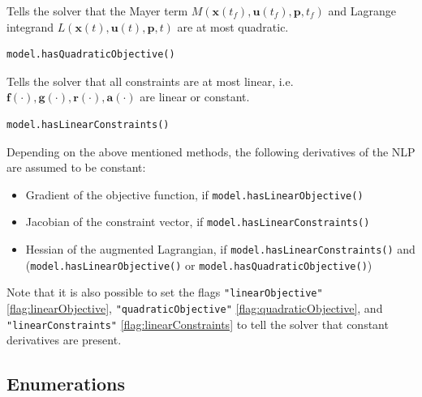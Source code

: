 \documentclass[12pt]{article}
\renewcommand{\v}{\bm}
\begin{document}
\begin{mdframed}[backgroundcolor=gray!10, roundcorner=10pt,
		linewidth=1pt]

	Tells the solver that the Mayer term $M(\v{x}(t_f), \v{u}(t_f),
		\v{p}, t_f)$ and Lagrange integrand $L(\v{x}(t), \v{u}(t),
		\v{p}, t)$ are at
	most quadratic.

	\begin{lstlisting}
model.hasQuadraticObjective()
	\end{lstlisting}
	\label{hasQuadraticObjective}

\end{mdframed}

\begin{mdframed}[backgroundcolor=gray!10, roundcorner=10pt,
		linewidth=1pt]

	Tells the solver that all constraints are at most linear, i.e.
	$\v{f}(\cdot), \v{g}(\cdot), \v{r}(\cdot), \v{a}(\cdot)$ are linear or
	constant.

	\begin{lstlisting}
model.hasLinearConstraints()
		\end{lstlisting}
	\label{hasLinearConstraints}

\end{mdframed}

Depending on the above mentioned methods, the following derivatives of
the NLP are assumed to be constant:

\begin{itemize}
	\item Gradient of the objective function, if
	      \texttt{model.hasLinearObjective()}
	\item Jacobian of the constraint vector, if
	      \texttt{model.hasLinearConstraints()}
	\item Hessian of the augmented Lagrangian, if
	      \texttt{model.hasLinearConstraints()} and
	      (\texttt{model.hasLinearObjective()}
	      or \texttt{model.hasQuadraticObjective()})
\end{itemize}

Note that it is also possible to set the flags \texttt{"linearObjective"} \eqref{flag:linearObjective}, \texttt{"quadraticObjective"} \eqref{flag:quadraticObjective}, and \texttt{"linearConstraints"} \eqref{flag:linearConstraints} to tell the solver that constant derivatives are present.

\subsection{Enumerations}
\end{document}
